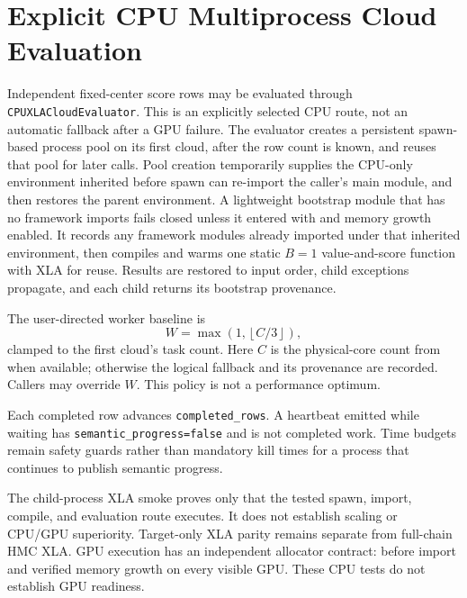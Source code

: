 \section{Explicit CPU Multiprocess Cloud Evaluation}
\label{sec:bf-cpu-xla-cloud}

Independent fixed-center score rows may be evaluated through
\texttt{CPUXLACloudEvaluator}.  This is an explicitly selected CPU route, not
an automatic fallback after a GPU failure.  The evaluator creates a persistent
spawn-based process pool on its first cloud, after the row count is known, and
reuses that pool for later calls.  Pool creation temporarily supplies the
CPU-only environment inherited before spawn can re-import the caller's main
module, and then restores the parent environment.  A lightweight bootstrap
module that has no framework imports fails closed unless it entered with
 and memory growth enabled.  It records any
framework modules already imported under that inherited environment, then
compiles and warms one static $B=1$ value-and-score function with XLA for reuse.
Results are restored to input order, child exceptions propagate, and each child
returns its bootstrap provenance.

The user-directed worker baseline is
\[
 W=\max\!\left(1,\left\lfloor C/3\right\rfloor\right),
\]
clamped to the first cloud's task count.  Here $C$ is the physical-core count from
 when available; otherwise the logical
 fallback and its provenance are recorded.  Callers may
override $W$.  This policy is not a performance optimum.

Each completed row advances \texttt{completed\_rows}.  A heartbeat emitted
while waiting has \texttt{semantic\_progress=false} and is not completed work.
Time budgets remain safety guards rather than mandatory kill times for a process
that continues to publish semantic progress.

The child-process XLA smoke proves only that the tested spawn, import, compile,
and evaluation route executes.  It does not establish scaling or CPU/GPU
superiority.  Target-only XLA parity remains separate from full-chain HMC XLA.
GPU execution has an independent allocator contract:
 before import and verified memory
growth on every visible GPU.  These CPU tests do not establish GPU readiness.
